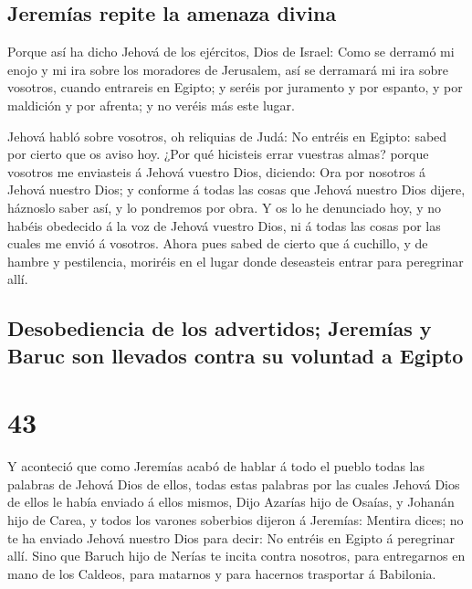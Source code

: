 \hypertarget{jeremuxedas-repite-la-amenaza-divina}{%
\subsection{Jeremías repite la amenaza
divina}\label{jeremuxedas-repite-la-amenaza-divina}}

 Porque así ha dicho Jehová de los ejércitos, Dios de
Israel: Como se derramó mi enojo y mi ira sobre los moradores de
Jerusalem, así se derramará mi ira sobre vosotros, cuando entrareis en
Egipto; y seréis por juramento y por espanto, y por maldición y por
afrenta; y no veréis más este lugar.

 Jehová habló sobre vosotros, oh reliquias de Judá: No
entréis en Egipto: sabed por cierto que os aviso hoy.  ¿Por
qué hicisteis errar vuestras almas? porque vosotros me enviasteis á
Jehová vuestro Dios, diciendo: Ora por nosotros á Jehová nuestro Dios; y
conforme á todas las cosas que Jehová nuestro Dios dijere, háznoslo
saber así, y lo pondremos por obra.  Y os lo he denunciado
hoy, y no habéis obedecido á la voz de Jehová vuestro Dios, ni á todas
las cosas por las cuales me envió á vosotros.  Ahora pues
sabed de cierto que á cuchillo, y de hambre y pestilencia, moriréis en
el lugar donde deseasteis entrar para peregrinar allí.

\hypertarget{desobediencia-de-los-advertidos-jeremuxedas-y-baruc-son-llevados-contra-su-voluntad-a-egipto}{%
\subsection{Desobediencia de los advertidos; Jeremías y Baruc son
llevados contra su voluntad a
Egipto}\label{desobediencia-de-los-advertidos-jeremuxedas-y-baruc-son-llevados-contra-su-voluntad-a-egipto}}

\hypertarget{section-42}{%
\section{43}\label{section-42}}

 Y aconteció que como Jeremías acabó de hablar á todo el
pueblo todas las palabras de Jehová Dios de ellos, todas estas palabras
por las cuales Jehová Dios de ellos le había enviado á ellos mismos,
 Dijo Azarías hijo de Osaías, y Johanán hijo de Carea, y
todos los varones soberbios dijeron á Jeremías: Mentira dices; no te ha
enviado Jehová nuestro Dios para decir: No entréis en Egipto á
peregrinar allí.  Sino que Baruch hijo de Nerías te incita
contra nosotros, para entregarnos en mano de los Caldeos, para matarnos
y para hacernos trasportar á Babilonia.

